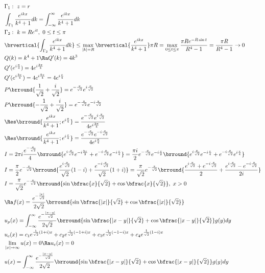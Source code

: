 \begin{align*}
    &\Gamma_1:\ z=r\\
    &\int_{\Gamma_1}\frac{e^{ikx}}{k^4+1}dk=\int_{-\infty}^\infty\frac{e^{ikx}}{k^4+1}dk\\
    &\Gamma_2:\ k=Re^{i t},\ 0\leq t\leq \pi\\
    &\brvertical{\int_{\Gamma_2}\frac{e^{ikx}}{k^4+1}dk}\leq\max_{|k|=R}\brvertical{\frac{e^{ikx}}{k^4+1}}\pi R=\max_{0\leq t\leq \pi}\frac{\pi Re^{-R\sin t}}{R^4-1}=\frac{\pi R}{R^4-1}\to 0\\
    &Q(k)=k^4+1\Ra Q'(k)=4k^3\\
    &Q'(e^{i\frac{\pi}{4}})=4e^{i\frac{3\pi}{4}}\\
    &Q'(e^{i\frac{3\pi}{4}})=4e^{i\frac{9\pi}{4}}=4e^{i\frac{\pi}{4}}\\
    &P\brround{\frac{1}{\sqrt{2}}+\frac{i}{\sqrt{2}}}=e^{-\frac{x}{\sqrt{2}}}e^{i\frac{x}{\sqrt{2}}}\\
    &P\brround{-\frac{1}{\sqrt{2}}+\frac{i}{\sqrt{2}}}=e^{-\frac{x}{\sqrt{2}}}e^{-i\frac{x}{\sqrt{2}}}\\
    &\Res\brround{\frac{e^{ikx}}{k^4+1};e^{i\frac{\pi}{4}}}=\frac{e^{-\frac{x}{\sqrt{2}}}e^{i\frac{x}{\sqrt{2}}}}{4e^{i\frac{3\pi}{4}}}\\
    &\Res\brround{\frac{e^{ikx}}{k^4+1};e^{i\frac{\pi}{4}}}=\frac{e^{-\frac{x}{\sqrt{2}}}e^{-i\frac{x}{\sqrt{2}}}}{4e^{i\frac{\pi}{4}}}\\
    &I=2\pi i\frac{e^{-\frac{x}{\sqrt{2}}}}{4}\brround{e^{i\frac{x}{\sqrt{2}}}e^{-i\frac{3\pi}{2}}+e^{-i\frac{x}{\sqrt{2}}}e^{-i\frac{\pi}{4}}}=\frac{\pi i}{2}e^{-\frac{x}{\sqrt{2}}}e^{-i\frac{\pi}{2}}\brround{e^{i\frac{x}{\sqrt{2}}}e^{-i\frac{\pi}{4}}+e^{-i\frac{x}{\sqrt{2}}}e^{i\frac{\pi}{4}}}\\
    &I=\frac{\pi}{2}e^{-\frac{x}{\sqrt{2}}}\brround{\frac{e^{i\frac{x}{\sqrt{2}}}}{\sqrt{2}}(1-i)+\frac{e^{-i\frac{x}{\sqrt{2}}}}{\sqrt{2}}(1+i)}=\frac{\pi}{\sqrt{2}}e^{-\frac{x}{\sqrt{2}}}\brround{\frac{e^{i\frac{x}{\sqrt{2}}}+e^{-i\frac{x}{\sqrt{2}}}}{2}+\frac{e^{i\frac{x}{\sqrt{2}}}-e^{-i\frac{x}{\sqrt{2}}}}{2i}}\\
    &I=\frac{\pi}{\sqrt{2}}e^{-\frac{x}{\sqrt{2}}}\brround{\sin\bfrac{x}{\sqrt{2}}+\cos\bfrac{x}{\sqrt{2}}},\ x>0\\
    &\Ra f(x)=\frac{e^{-\frac{|x|}{\sqrt{2}}}}{2\sqrt{2}}\brround{\sin\bfrac{|x|}{\sqrt{2}}+\cos\bfrac{|x|}{\sqrt{2}}}\\
    &u_p(x)=\int_{-\infty}^\infty \frac{e^{-\frac{|x-y|}{\sqrt{2}}}}{2\sqrt{2}}\brround{\sin\bfrac{|x-y|}{\sqrt{2}}+\cos\bfrac{|x-y|}{\sqrt{2}}}g(y)dy\\
    &u_c(x)=c_1e^{\frac{1}{\sqrt{2}}(1+i)x}+c_2e^{\frac{1}{\sqrt{2}}(-1+i)x}+c_3e^{\frac{1}{\sqrt{2}}(-1-i)x}+c_4e^{\frac{1}{\sqrt{2}}(1-i)x}\\
    &\lim_{|x|\to\infty} u(x)=0\Ra u_c(x)=0\\
    &u(x)=\int_{-\infty}^\infty \frac{e^{-\frac{|x-y|}{\sqrt{2}}}}{2\sqrt{2}}\brround{\sin\bfrac{|x-y|}{\sqrt{2}}+\cos\bfrac{|x-y|}{\sqrt{2}}}g(y)dy
\end{align*}

